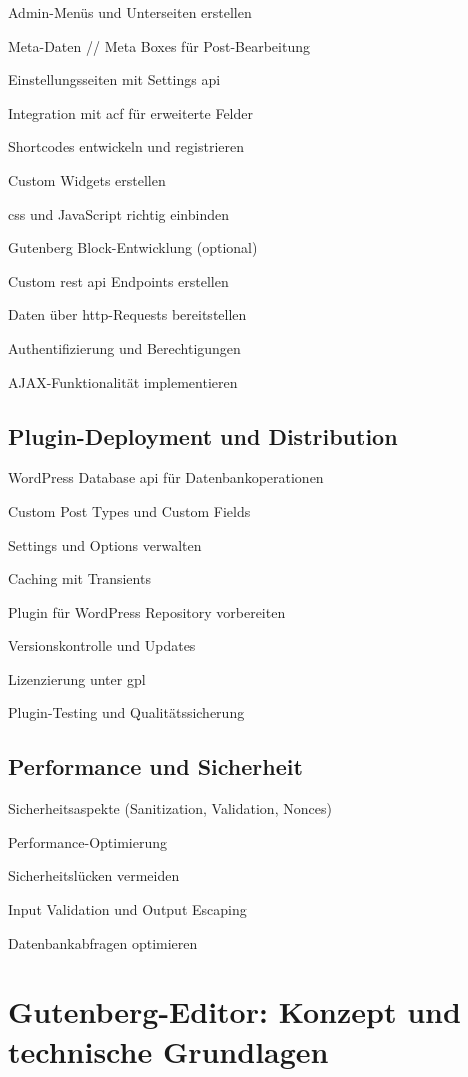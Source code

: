 Admin-Menüs und Unterseiten erstellen

Meta-Daten // Meta Boxes für Post-Bearbeitung

Einstellungsseiten mit Settings \gls{api}

Integration mit \gls{acf} für erweiterte Felder

Shortcodes entwickeln und registrieren

Custom Widgets erstellen

\gls{css} und JavaScript richtig einbinden

Gutenberg Block-Entwicklung (optional)

Custom \gls{rest} \gls{api} Endpoints erstellen

Daten über \gls{http}-Requests bereitstellen

Authentifizierung und Berechtigungen

AJAX-Funktionalität implementieren

\subsection{Plugin-Deployment und Distribution}

WordPress Database \gls{api} für Datenbankoperationen

Custom Post Types und Custom Fields

Settings und Options verwalten

Caching mit Transients

Plugin für WordPress Repository vorbereiten

Versionskontrolle und Updates

Lizenzierung unter \gls{gpl}

Plugin-Testing und Qualitätssicherung

\subsection{Performance und Sicherheit}

Sicherheitsaspekte (Sanitization, Validation, Nonces)

Performance-Optimierung

Sicherheitslücken vermeiden

Input Validation und Output Escaping

Datenbankabfragen optimieren

\section{Gutenberg-Editor: Konzept und technische Grundlagen}
